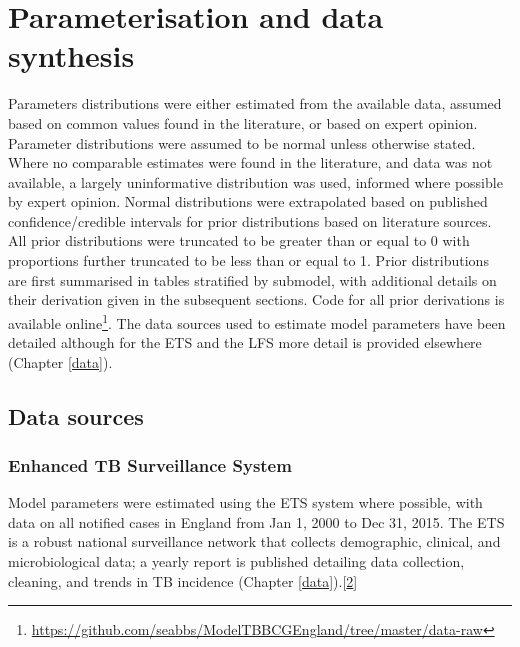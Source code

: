\documentclass[11pt,twoside]{bristolthesis}
\begin{document}
  \hypertarget{parameterisation-and-data-synthesis}{%
  \section{Parameterisation and data synthesis}\label{parameterisation-and-data-synthesis}}
  
  Parameters distributions were either estimated from the available data, assumed based on common values found in the literature, or based on expert opinion. Parameter distributions were assumed to be normal unless otherwise stated. Where no comparable estimates were found in the literature, and data was not available, a largely uninformative distribution was used, informed where possible by expert opinion. Normal distributions were extrapolated based on published confidence/credible intervals for prior distributions based on literature sources. All prior distributions were truncated to be greater than or equal to 0 with proportions further truncated to be less than or equal to 1. Prior distributions are first summarised in tables stratified by submodel, with additional details on their derivation given in the subsequent sections. Code for all prior derivations is available online\footnote{\url{https://github.com/seabbs/ModelTBBCGEngland/tree/master/data-raw}}. The data sources used to estimate model parameters have been detailed although for the ETS and the LFS more detail is provided elsewhere (Chapter \ref{data}).
  
  \hypertarget{data-sources-1}{%
  \subsection{Data sources}\label{data-sources-1}}
  
  \hypertarget{enhanced-tb-surveillance-system}{%
  \subsubsection{Enhanced TB Surveillance System}\label{enhanced-tb-surveillance-system}}
  
  Model parameters were estimated using the ETS system where possible, with data on all notified cases in England from Jan 1, 2000 to Dec 31, 2015. The ETS is a robust national surveillance network that collects demographic, clinical, and microbiological data; a yearly report is published detailing data collection, cleaning, and trends in TB incidence (Chapter \ref{data}).{[}\protect\hyperlink{ref-PHE2017}{2}{]}
  
\end{document}
